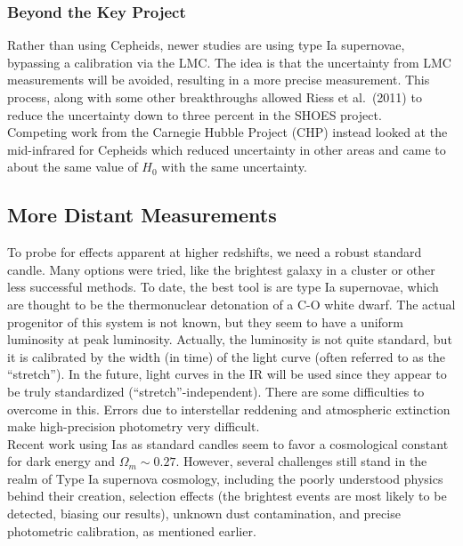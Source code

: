 \documentclass[10pt]{article}
\numberwithin{equation}{section}
\newcommand{\n}{\noindent}
\begin{document}
	\subsubsection{Beyond the Key Project} %
	\label{ssub:beyond_the_key_project}
		Rather than using Cepheids, newer studies are using type Ia supernovae, bypassing a calibration via the LMC. The idea is that the uncertainty from LMC measurements will be avoided, resulting in a more precise measurement. This process, along with some other breakthroughs allowed Riess et al.~(2011) to reduce the uncertainty down to three percent in the SHOES project.\\
		
		\n Competing work from the Carnegie Hubble Project (CHP) instead looked at the mid-infrared for Cepheids which reduced uncertainty in other areas and came to about the same value of $H_0$ with the same uncertainty.
	\subsection{More Distant Measurements} %
	\label{sub:more_distant_measurements}
		To probe for effects apparent at higher redshifts, we need a robust standard candle. Many options were tried, like the brightest galaxy in a cluster or other less successful methods. To date, the best tool is are type Ia supernovae, which are thought to be the thermonuclear detonation of a C-O white dwarf. The actual progenitor of this system is not known, but they seem to have a uniform luminosity at peak luminosity. Actually, the luminosity is not quite standard, but it is calibrated by the width (in time) of the light curve (often referred to as the ``stretch''). In the future, light curves in the IR will be used since they appear to be truly standardized (``stretch''-independent). There are some difficulties to overcome in this. Errors due to interstellar reddening and atmospheric extinction make high-precision photometry very difficult.\\
		
		\n Recent work using Ias as standard candles seem to favor a cosmological constant for dark energy and $\Omega_m\sim 0.27$. However, several challenges still stand in the realm of Type Ia supernova cosmology, including the poorly understood physics behind their creation, selection effects (the brightest events are most likely to be detected, biasing our results), unknown dust contamination, and precise photometric calibration, as mentioned earlier.
\end{document}
